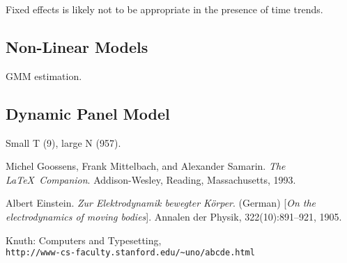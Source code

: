\documentclass[11pt]{article}
\begin{document}
Fixed effects is likely not to be appropriate in the presence of time trends. 

\subsection{Non-Linear Models}

GMM estimation.

\subsection{Dynamic Panel Model}

Small T (9), large N (957). 


\begin{thebibliography}{9}

Michel Goossens, Frank Mittelbach, and Alexander Samarin. 
\textit{The \LaTeX\ Companion}. 
Addison-Wesley, Reading, Massachusetts, 1993.

Albert Einstein. 
\textit{Zur Elektrodynamik bewegter K{\"o}rper}. (German) 
[\textit{On the electrodynamics of moving bodies}]. 
Annalen der Physik, 322(10):891–921, 1905.

Knuth: Computers and Typesetting,
\\\texttt{http://www-cs-faculty.stanford.edu/\~{}uno/abcde.html}
\end{thebibliography}
\end{document}
